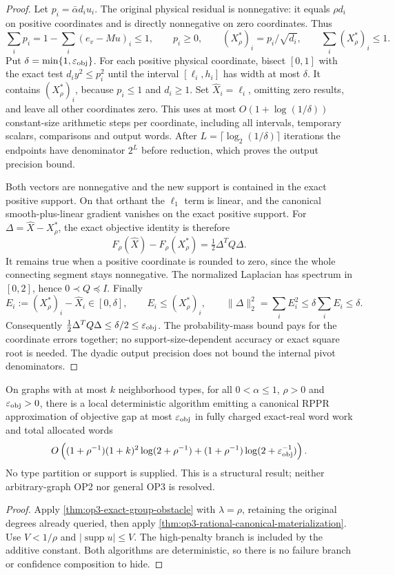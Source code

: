 \begin{proof}
Let $p_i=\bar\alpha d_i u_i$. The original physical residual is nonnegative:
it equals $\rho d_i$ on positive coordinates and is directly nonnegative
on zero coordinates. Thus
\[
 \sum_i p_i=1-\sum_i(e_v-Mu)_i\leq1,
 \qquad p_i\geq0,
 \qquad (X_\rho^*)_i=p_i/\sqrt{d_i},
 \qquad \sum_i(X_\rho^*)_i\leq1.
\]
Put $\delta=\min\{1,\varepsilon_{\mathrm{obj}}\}$. For each positive physical coordinate,
bisect $[0,1]$ with the exact test $d_i y^2\leq p_i^2$ until the interval
$[\ell_i,h_i]$ has width at most $\delta$. It contains $(X_\rho^*)_i$,
because $p_i\leq1$ and $d_i\geq1$. Set $\widehat X_i=\ell_i$, omitting zero
results, and leave all other coordinates zero. This uses at most
$O(1+\log(1/\delta))$ constant-size arithmetic steps per coordinate,
including all intervals, temporary scalars, comparisons and output words.
After $L=\lceil\log_2(1/\delta)\rceil$ iterations the endpoints have
denominator $2^L$ before reduction, which proves the output precision bound.

Both vectors are nonnegative and the new support is contained in the
exact positive support. On that orthant the $\ell_1$ term is linear,
and the canonical smooth-plus-linear gradient vanishes on the exact
positive support. For $\Delta=\widehat X-X_\rho^*$, the exact objective
identity is therefore
\[
 F_\rho(\widehat X)-F_\rho(X_\rho^*)=\tfrac12\Delta^TQ\Delta.
\]
It remains true when a positive coordinate is rounded to zero, since the
whole connecting segment stays nonnegative. The normalized Laplacian has
spectrum in $[0,2]$, hence $0\prec Q\preceq I$. Finally
\[
 E_i:=(X_\rho^*)_i-\widehat X_i\in[0,\delta],\qquad
 E_i\leq(X_\rho^*)_i,\qquad
 \|\Delta\|_2^2=\sum_i E_i^2
 \leq\delta\sum_i E_i\leq\delta.
\]
Consequently $\tfrac12\Delta^TQ\Delta\leq\delta/2\leq\varepsilon_{\mathrm{obj}}$.
The probability-mass bound pays for the coordinate errors together; no
support-size-dependent accuracy or exact square root is needed. The dyadic
output precision does not bound the internal pivot denominators.
\end{proof}

\begin{corollary}
\label{cor:op3-canonical-rppr-neighborhood-types}
On graphs with at most $k$ neighborhood types, for all $0<\alpha\leq1$,
$\rho>0$ and $\varepsilon_{\mathrm{obj}}>0$, there is a local deterministic algorithm
emitting a canonical RPPR approximation of objective gap at most $\varepsilon_{\mathrm{obj}}$
in fully charged exact-real word work and total allocated words
\[
 O\left((1+\rho^{-1})(1+k)^2\log(2+\rho^{-1})
       +(1+\rho^{-1})\log(2+\varepsilon_{\mathrm{obj}}^{-1})\right).
\]
No type partition or support is supplied. This is a structural result;
neither arbitrary-graph OP2 nor general OP3 is resolved.
\end{corollary}
\begin{proof}
Apply \cref{thm:op3-exact-group-obstacle} with $\lambda=\rho$, retaining
the original degrees already queried, then apply
\cref{thm:op3-rational-canonical-materialization}. Use $V<1/\rho$ and
$|\operatorname{supp}u|\leq V$. The high-penalty branch is included by
the additive constant. Both algorithms are deterministic, so there is no
failure branch or confidence composition to hide.
\end{proof}

